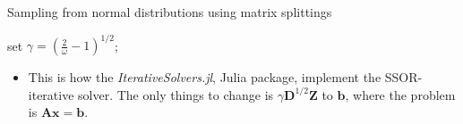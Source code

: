 \documentclass[10pt]{beamer}
\begin{document}
\begin{frame}{Sampling from normal distributions using matrix splittings}
    \begin{algorithm}[H]
        
        set $\gamma = (\frac{2}{\omega} - 1)^{1/2}$; \newline
        
        \caption{SSOR sampling from $\mathbf{N}(0, \mathbf{A}^{-1})$}
    \end{algorithm}
    
    \begin{itemize}
        \item This is how the \emph{\color{blue} IterativeSolvers.jl}, Julia package, implement
        the SSOR-iterative solver. The only things to change is
        $\gamma\mathbf{D}^{1/2}\mathbf{Z}$ to $\mathbf{b}$, where the problem is 
        $\mathbf{A}\mathbf{x} = \mathbf{b}$.
    \end{itemize}
\end{frame}
\end{document}
